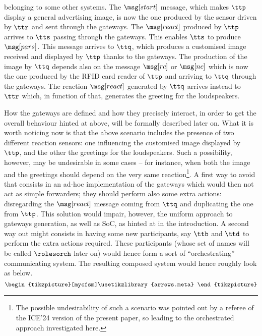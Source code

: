 \begin{example}
{belonging to some other systems.
The $\msg[start]$ message, which makes $\ttp$ display a general advertising image,
is now the one produced by the sensor driven by $\ttr$ and sent through the gateways.
The $\msg[react]$ produced by $\ttp$ arrives to $\tts$ passing through the gateways.
This enables  $\tts$ to produce $\msg[pars]$. This message arrives to $\ttq$, which
produces a customised image received and displayed by $\ttp$ thanks to the gateways. 
The production of the image by $\ttq$ depends also on the message $\msg[rc]$ or $\msg[nc]$ which is now the one produced by the RFID card reader of $\ttp$ and arriving to $\ttq$ through the gateways.
The reaction  $\msg[react]$ generated
by $\ttq$ arrives instead to $\ttr$ which, in function of that, generates the greeting for the loudspeakers.
\smallskip

How the gateways are defined and how they precisely interact, in order to get the
overall behaviour hinted at above, will be formally described later on.
What it is worth noticing now is that  the above scenario includes the presence of two different
reaction sensors: one influencing the customised image displayed by $\ttp$, and the other
the greetings for the loudspeakers. 
Such a possibility, however, may be undesirable in some cases -- for instance, when both the image and the greetings should depend on the very same 
reaction\footnote{The possible undesirability of such a scenario was pointed out by a referee of
the ICE'24 version of the present paper, so leading to the orchestrated approach investigated here.}.
A first way to avoid that consists in an ad-hoc implementation of the gateways which would then 
not act as simple forwarders; they should perform also some extra actions: 
disregarding the $\msg[react]$ message coming  from  $\ttq$ and duplicating the one from $\ttp$.
 This solution would impair, however, the uniform approach to gateways generation, as well as SoC, as hinted at in the introduction. %
A second way out might consists in having some new participants, say $\ttb$ and $\ttd$ to perform the extra actions required. These participants (whose set of names will be called $\rolesorch$ later on) would hence form a sort of ``orchestrating'' 
communicating system. The resulting composed system would hence roughly look as
below.
    $$
\begin{tikzpicture}[mycfsm]\usetikzlibrary {arrows.meta}

\end{tikzpicture}$$}
\end{example}
